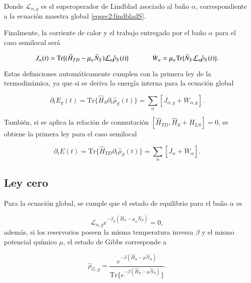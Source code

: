 Donde $\mathcal{L}_{\alpha,g}$ es el superoperador de Lindblad asociado al baño $\alpha$, correspondiente a la ecuación maestra global \ref{eqsec2:lindbladS}.

Finalmente, la corriente de calor y el trabajo entregado por el baño $\alpha$ para el caso semilocal será

\begin{equation}
    J_{\alpha}(t) = \text{Tr}\{(\hat{H}_{TD} - \mu_{\alpha}\hat{N}_S)\mathcal{L}_{\alpha}\hat{\rho}_{S}(t) \} \hspace{12mm} \dot{W}_{\alpha} = \mu_{\alpha} \text{Tr}\{\hat{N}_{S}\mathcal{L}_{\alpha}\hat{\rho}_{S}(t) \}.
\label{sec2:heatworkeq}
\end{equation}

Estas definiciones automáticamente cumplen con la primera ley de la termodinámica, ya que si se deriva la energía interna para la ecuación global 

\begin{equation*}
    \partial_{t}E_{g}(t) = \text{Tr}\{ \hat{H}_{S}\partial_{t}\hat{\rho}_{S}(t) \} = \sum_{\alpha}[J_{\alpha,g} + \dot{W}_{\alpha,g}].
\end{equation*}

También, si se aplica la relación de conmutación $[\hat{H}_{TD},\hat{H}_{S} + \hat{H}_{LS}] = 0$, se obtiene la primera ley para el caso semilocal 

\begin{equation*}
    \partial_{t}E(t) = \text{Tr}\{ \hat{H}_{TD}\partial_{t}\hat{\rho}_{S}(t) \} = \sum_{\alpha}[J_{\alpha} + \dot{W}_{\alpha}].
\end{equation*}

\subsection{Ley cero}
Para la ecuación global, se cumple que el estado de equilibrio para el baño $\alpha$ es 

\begin{equation*}
    \mathcal{L}_{\alpha,g}e^{-\beta_{\alpha}(\hat{H}_{S} - \mu_{\alpha}\hat{N}_{S})} = 0,
\end{equation*}
además, si los reservorios poseen la misma temperatura inversa $\beta$ y el mismo potencial químico $\mu$, el estado de Gibbs corresponde a

\begin{equation*}
    \hat{\rho}_{G,g} = \frac{e^{-\beta(\hat{H}_{S} - \mu \hat{N}_{S})}}{\text{Tr}\{ e^{-\beta(\hat{H}_{S} - \mu \hat{N}_{S})}\}}.
\end{equation*}

